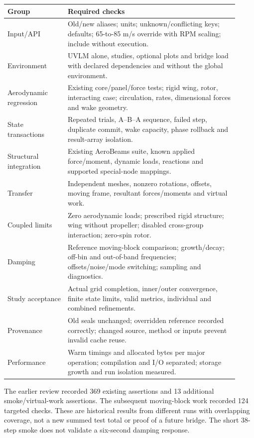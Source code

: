 \documentclass[11pt,a4paper]{article}
\begin{document}
\begingroup\small
\begin{longtable}{@{}L{0.24\linewidth}L{0.68\linewidth}@{}}
\toprule
Group & Required checks\\
\midrule\endhead
Input/API & Old/new aliases; units; unknown/conflicting keys; defaults;
65-to-85 m/s override with RPM scaling; include without execution.\\
Environment & UVLM alone, studies, optional plots and bridge load with declared
dependencies and without the global environment.\\
Aerodynamic regression & Existing core/panel/force tests; rigid wing, rotor,
interacting case; circulation, rates, dimensional forces and wake geometry.\\
State transactions & Repeated trials, A--B--A sequence, failed step, duplicate
commit, wake capacity, phase rollback and result-array isolation.\\
Structural integration & Existing AeroBeams suite, known applied force/moment,
dynamic loads, reactions and supported special-node mappings.\\
Transfer & Independent meshes, nonzero rotations, offsets, moving frame,
resultant forces/moments and virtual work.\\
Coupled limits & Zero aerodynamic loads; prescribed rigid structure; wing
without propeller; disabled cross-group interaction; zero-spin rotor.\\
Damping & Reference moving-block comparison; growth/decay; off-bin and
out-of-band frequencies; offsets/noise/mode switching; sampling and diagnostics.\\
Study acceptance & Actual grid completion, inner/outer convergence, finite
state limits, valid metrics, individual and combined refinements.\\
Provenance & Old seals unchanged; overridden reference recorded correctly;
changed source, method or inputs prevent invalid cache reuse.\\
Performance & Warm timings and allocated bytes per major operation; compilation
and I/O separated; storage growth and run isolation measured.\\
\bottomrule
\end{longtable}
\endgroup

The earlier review recorded 369 existing assertions and 13 additional
smoke/virtual-work assertions. The subsequent moving-block work recorded
124 targeted checks. These are historical results from different runs with
overlapping coverage, not a new summed test total or proof of a future bridge.
The short 38-step smoke does not validate a six-second damping response.
\end{document}
